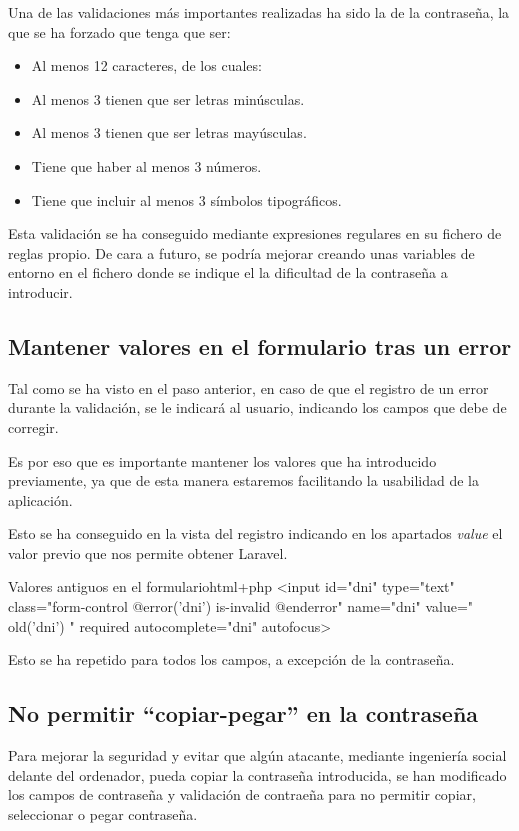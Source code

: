 \documentclass{\ClassPath/viu-tfm-template}
\begin{document}
Una de las validaciones más importantes realizadas ha sido la de la contraseña, la que se ha forzado que tenga que ser:

\begin{itemize}
    \item Al menos 12 caracteres, de los cuales:
    \item Al menos 3 tienen que ser letras minúsculas.
    \item Al menos 3 tienen que ser letras mayúsculas.
    \item Tiene que haber al menos 3 números.
    \item Tiene que incluir al menos 3 símbolos tipográficos.
\end{itemize}

Esta validación se ha conseguido mediante expresiones regulares en su fichero de reglas propio. De cara a futuro, se podría mejorar creando unas variables de entorno en el fichero  donde se indique el la dificultad de la contraseña a introducir.

\subsection{Mantener valores en el formulario tras un error}
Tal como se ha visto en el paso anterior, en caso de que el registro de un error durante la validación, se le indicará al usuario, indicando los campos que debe de corregir.

Es por eso que es importante mantener los valores que ha introducido previamente, ya que de esta manera estaremos facilitando la usabilidad de la aplicación.

Esto se ha conseguido en la vista del registro indicando en los apartados \textit{value} el valor previo que nos permite obtener Laravel.


\begin{mycode}{Valores antiguos en el formulario}{html+php}{}
<input id="dni" type="text" class="form-control
    @error('dni') is-invalid @enderror" name="dni"
    value="{{ old('dni') }}"
    required autocomplete="dni" autofocus>
\end{mycode}

Esto se ha repetido para todos los campos, a excepción de la contraseña.

\subsection{No permitir “copiar-pegar” en la contraseña}
Para mejorar la seguridad y evitar que algún atacante, mediante ingeniería social delante del ordenador, pueda copiar la contraseña introducida, se han modificado los campos de contraseña y validación de contraeña para no permitir copiar, seleccionar o pegar contraseña.
\end{document}
